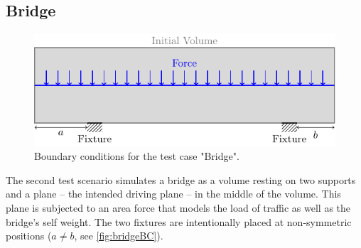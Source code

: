 \subsection{Bridge}
\label{ssec:bridge}
\begin{figure}[H]
\begin{center}
\includegraphics[scale=0.8]{Pictures/tikzBridge/bridge.pdf}
\end{center}
\caption{Boundary conditions for the test case "Bridge".}
\label{fig:bridgeBC}
\end{figure}
The second test scenario simulates a bridge as a volume resting on two supports and a plane -- the intended driving plane -- in the middle of the volume. This plane is subjected to an area force that models the load of traffic as well as the bridge's self weight. The two fixtures are intentionally placed at non-symmetric positions ($a\neq b$, see \autoref{fig:bridgeBC}).


